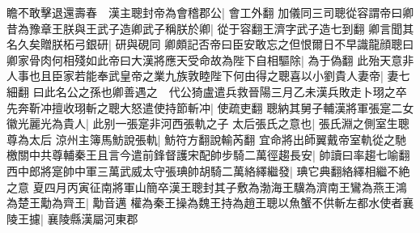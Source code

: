 瞻不敢擊退還壽春　漢主聰封帝為會稽郡公|{
	會工外翻}
加儀同三司聰從容謂帝曰卿昔為豫章王朕與王武子造卿武子稱朕於卿|{
	從于容翻王濟字武子造七到翻}
卿言聞其名久矣贈朕柘弓銀研|{
	研與硯同}
卿頗記否帝曰臣安敢忘之但恨爾日不早識龍顔聰曰卿家骨肉何相殘如此帝曰大漢將應天受命故為陛下自相驅除|{
	為于偽翻}
此殆天意非人事也且臣家若能奉武皇帝之業九族敦睦陛下何由得之聰喜以小劉貴人妻帝|{
	妻七細翻}
曰此名公之孫也卿善遇之　代公猗盧遣兵救晉陽三月乙未漢兵敗走卜珝之卒先奔靳冲擅收珝斬之聰大怒遣使持節斬冲|{
	使疏吏翻}
聰納其舅子輔漢將軍張寔二女徽光麗光為貴人|{
	此别一張寔非河西張軌之子}
太后張氏之意也|{
	張氏淵之側室生聰尊為太后}
涼州主簿馬魴說張軌|{
	魴符方翻說輸芮翻}
宜命將出師翼戴帝室軌從之馳檄關中共尊輔秦王且言今遣前鋒督護宋配帥步騎二萬徑趨長安|{
	帥讀曰率趨七喻翻}
西中郎將寔帥中軍三萬武威太守張琠帥胡騎二萬絡繹繼發|{
	琠它典翻絡繹相繼不絶之意}
夏四月丙寅征南將軍山簡卒漢王聰封其子敷為渤海王驥為濟南王鸞為燕王鴻為楚王勱為齊王|{
	勱音邁}
權為秦王操為魏王持為趙王聰以魚蟹不供斬左都水使者襄陵王攄|{
	襄陵縣漢屬河東郡}


